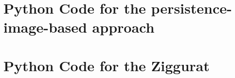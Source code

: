 \documentclass[english, LaM, oneside, noexaminfo]{sapthesis}
\begin{document}
\appendix

\chapter{Python Code for the persistence-image-based approach}
\label{appendix A}



\section{}

\chapter{Python Code for the Ziggurat}
\label{appendix B}








\printbibliography
\end{document}
